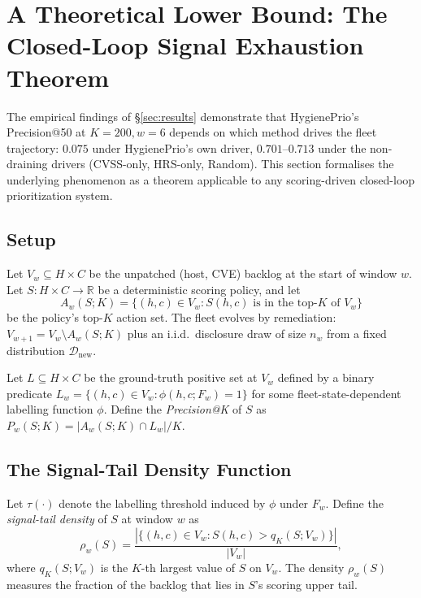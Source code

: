 \section{A Theoretical Lower Bound: The Closed-Loop Signal Exhaustion Theorem}
\label{sec:theorem}

The empirical findings of \S\ref{sec:results} demonstrate that
HygienePrio's Precision@50 at $K = 200, w = 6$ depends on which method
drives the fleet trajectory: $0.075$ under HygienePrio's own driver,
$0.701$--$0.713$ under the non-draining drivers (CVSS-only, HRS-only,
Random). This section formalises the
underlying phenomenon as a theorem applicable to any
scoring-driven closed-loop prioritization system.

\subsection{Setup}

Let $V_w \subseteq H \times C$ be the unpatched (host, CVE) backlog
at the start of window $w$. Let $S: H \times C \to \mathbb{R}$ be a
deterministic scoring policy, and let
\begin{equation}
A_w(S; K) = \{(h, c) \in V_w : S(h, c) \text{ is in the top-}K \text{ of } V_w\}
\end{equation}
be the policy's top-$K$ action set. The fleet evolves by remediation:
$V_{w+1} = V_w \setminus A_w(S; K)$ plus an i.i.d.\ disclosure draw
of size $n_w$ from a fixed distribution $\mathcal{D}_{\text{new}}$.

Let $L \subseteq H \times C$ be the ground-truth positive set
at $V_w$ defined by a binary predicate
$L_w = \{(h, c) \in V_w : \phi(h, c; F_w) = 1\}$ for some
fleet-state-dependent labelling function $\phi$. Define the
\emph{Precision@K} of $S$ as $P_w(S; K) = |A_w(S; K) \cap L_w| / K$.

\subsection{The Signal-Tail Density Function}

Let $\tau(\cdot)$ denote the labelling threshold induced by $\phi$
under $F_w$. Define the \emph{signal-tail density} of $S$ at window
$w$ as
\begin{equation}
\rho_w(S) = \frac{|\{(h, c) \in V_w : S(h, c) > q_K(S; V_w)\}|}{|V_w|},
\end{equation}
where $q_K(S; V_w)$ is the $K$-th largest value of $S$ on $V_w$. The
density $\rho_w(S)$ measures the fraction of the backlog that lies in
$S$'s scoring upper tail.

